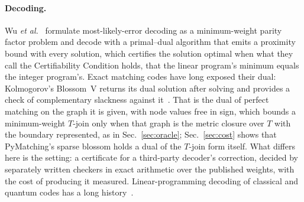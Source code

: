 \documentclass[aps,pra,twocolumn,superscriptaddress,nofootinbib,longbibliography,floatfix]{revtex4-2}
\newcommand{\T}{T}
\begin{document}
\paragraph*{Decoding.} Wu \textit{et al.}~\cite{wu2025minimum} formulate most-likely-error decoding as a minimum-weight parity factor problem and decode with a primal--dual algorithm that emits a proximity bound with every solution, which certifies the solution optimal when what they call the Certifiability Condition holds, that the linear program's minimum equals the integer program's. Exact matching codes have long exposed their dual: Kolmogorov's Blossom~V returns its dual solution after solving and provides a check of complementary slackness against it~\cite{kolmogorov2009blossom}. That is the dual of perfect matching on the graph it is given, with node values free in sign, which bounds a minimum-weight $\T$-join only when that graph is the metric closure over $\T$ with the boundary represented, as in Sec.~\ref{sec:oracle}; Sec.~\ref{sec:cost} shows that PyMatching's sparse blossom holds a dual of the $\T$-join form itself. What differs here is the setting: a certificate for a third-party decoder's correction, decided by separately written checkers in exact arithmetic over the published weights, with the cost of producing it measured. Linear-programming decoding of classical and quantum codes has a long history~\cite{feldman2005lp,li2018lp}.
\end{document}
